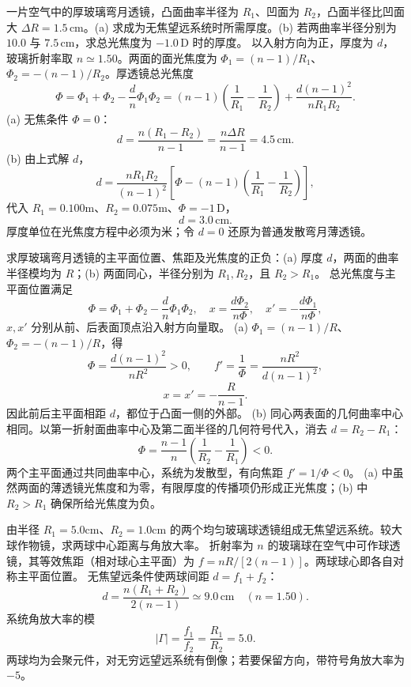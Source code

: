 一片空气中的厚玻璃弯月透镜，凸面曲率半径为 $R_1$、凹面为 $R_2$，凸面半径比凹面大 $\Delta R=1.5\,\mathrm{cm}$。(a) 求成为无焦望远系统时所需厚度。(b) 若两曲率半径分别为 $10.0$ 与 $7.5\,\mathrm{cm}$，求总光焦度为 $-1.0\,\mathrm D$ 时的厚度。
\exsolution
以入射方向为正，厚度为 $d$，玻璃折射率取 $n\simeq1.50$。两面的面光焦度为
$\Phi_1=(n-1)/R_1$、
$\Phi_2=-(n-1)/R_2$。厚透镜总光焦度
\[
\Phi=\Phi_1+\Phi_2-\frac dn\Phi_1\Phi_2
=(n-1)\left(\frac1{R_1}-\frac1{R_2}\right)
+\frac{d(n-1)^2}{nR_1R_2}.
\]
(a) 无焦条件 $\Phi=0$：
\[
\boxed{d=\frac{n(R_1-R_2)}{n-1}
=\frac{n\Delta R}{n-1}=4.5\,\mathrm{cm}}.
\]
(b) 由上式解 $d$，
\[
d=\frac{nR_1R_2}{(n-1)^2}
\left[\Phi-(n-1)\left(\frac1{R_1}-\frac1{R_2}\right)\right],
\]
代入 $R_1=0.100$m、$R_2=0.075$m、$\Phi=-1\,\mathrm D$，
\[
\boxed{d=3.0\,\mathrm{cm}}.
\]
\excheck 厚度单位在光焦度方程中必须为米；令 $d=0$ 还原为普通发散弯月薄透镜。

求厚玻璃弯月透镜的主平面位置、焦距及光焦度的正负：(a) 厚度 $d$，两面的曲率半径模均为 $R$；(b) 两面同心，半径分别为 $R_1,R_2$，且 $R_2>R_1$。
\exsolution
总光焦度与主平面位置满足
\[
\Phi=\Phi_1+\Phi_2-\frac dn\Phi_1\Phi_2,\quad
x=\frac{d\Phi_2}{n\Phi},\quad
x'=-\frac{d\Phi_1}{n\Phi},
\]
$x,x'$ 分别从前、后表面顶点沿入射方向量取。
(a) $\Phi_1=(n-1)/R$、
$\Phi_2=-(n-1)/R$，得
\[
\boxed{\Phi=\frac{d(n-1)^2}{nR^2}>0},\qquad
\boxed{f'=\frac1\Phi=\frac{nR^2}{d(n-1)^2}},
\]
\[
\boxed{x=x'=-\frac R{n-1}}.
\]
因此前后主平面相距 $d$，都位于凸面一侧的外部。
(b) 同心两表面的几何曲率中心相同。以第一折射面曲率中心及第二面半径的几何符号代入，消去 $d=R_2-R_1$：
\[
\boxed{\Phi=\frac{n-1}{n}
\left(\frac1{R_2}-\frac1{R_1}\right)<0}.
\]
两个主平面通过共同曲率中心，系统为发散型，有向焦距 $\boxed{f'=1/\Phi<0}$。
\excheck (a) 中虽然两面的薄透镜光焦度和为零，有限厚度的传播项仍形成正光焦度；(b) 中 $R_2>R_1$ 确保所给光焦度为负。

由半径 $R_1=5.0$cm、$R_2=1.0$cm 的两个均匀玻璃球透镜组成无焦望远系统。较大球作物镜，求两球中心距离与角放大率。
\exsolution
折射率为 $n$ 的玻璃球在空气中可作球透镜，其等效焦距（相对球心主平面）为
$f=nR/[2(n-1)]$。两球球心即各自对称主平面位置。
无焦望远条件使两球间距
$d=f_1+f_2$：
\[
\boxed{d=\frac{n(R_1+R_2)}{2(n-1)}
\simeq9.0\,\mathrm{cm}}\quad(n=1.50).
\]
系统角放大率的模
\[
\boxed{|\Gamma|=\frac{f_1}{f_2}=\frac{R_1}{R_2}=5.0}.
\]
\excheck 两球均为会聚元件，对无穷远望远系统有倒像；若要保留方向，带符号角放大率为 $-5$。

